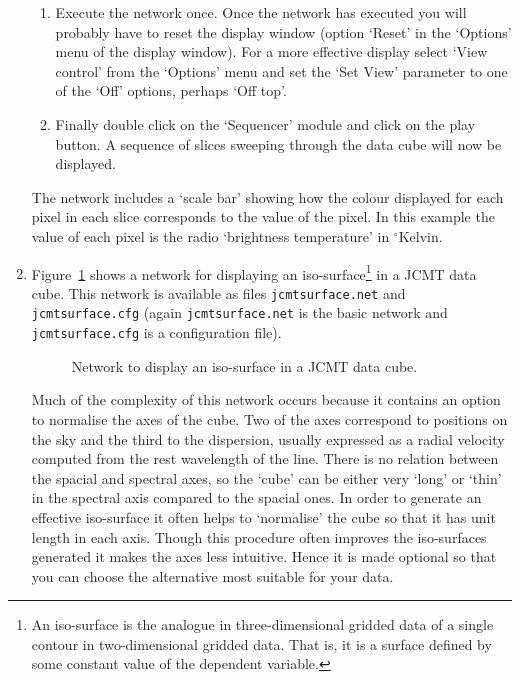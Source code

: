 \documentclass[twoside,11pt]{article}
\begin{document}
\begin{enumerate}
\begin{enumerate}
    \item Execute the network once.  Once the network has executed you
     will probably have to reset the display window (option `Reset' in
     the `Options' menu of the display window).  For a more effective
     display select `View control' from the `Options' menu and set the
     `Set View' parameter to one of the `Off' options, perhaps `Off top'.

    \item Finally double click on the `Sequencer' module and click on
     the play button.  A sequence of slices sweeping through the data
     cube will now be displayed.

  \end{enumerate}

   The network includes a `scale bar' showing how the colour displayed
   for each pixel in each slice corresponds to the value of the pixel.
   In this example the value of each pixel is the radio `brightness
   temperature' in $^{\circ}$Kelvin.

  \item Figure~\ref{JCMTSURFACE} shows a network for displaying an
   iso-surface\footnote{An iso-surface is the analogue in
   three-dimensional gridded data of a single contour in two-dimensional
   gridded data. That is, it is a surface defined by some constant value
   of the dependent variable.} in a JCMT data cube.  This network is
   available as files {\tt jcmtsurface.net} and {\tt jcmtsurface.cfg}
   (again {\tt jcmtsurface.net} is the basic network and {\tt
   jcmtsurface.cfg} is a configuration file).

  \begin{figure}[htbp]

  \begin{center}
  \leavevmode
  \epsfxsize=450pt
  \end{center}

  \caption[Network to display an iso-surface in a JCMT data cube.]
   {Network to display an iso-surface in a JCMT data cube.
   \label{JCMTSURFACE} }

  \end{figure}

   Much of the complexity of this network occurs because it contains an
   option to normalise the axes of the cube.  Two of the axes correspond
   to positions on the sky and the third to the dispersion, usually
   expressed as a radial velocity computed from the rest wavelength of
   the line.  There is no relation between the spacial and spectral
   axes, so the `cube' can be either very `long' or `thin' in the
   spectral axis compared to the spacial ones.  In order to generate
   an effective iso-surface it often helps to `normalise' the cube
   so that it has unit length in each axis.  Though this procedure
   often improves the iso-surfaces generated it makes the axes less
   intuitive.  Hence it is made optional so that you can choose the
   alternative most suitable for your data.


\end{enumerate}
\end{document}

